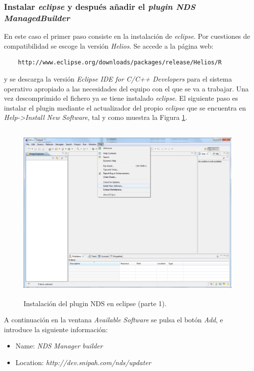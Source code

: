 \subsubsection{Instalar \textit{eclipse} y después añadir el \textit{plugin NDS ManagedBuilder}}
En este caso el primer paso consiste en la instalación de \textit{eclipse}. Por cuestiones de compatibilidad se escoge la versión \textit{Helios}. Se accede a la página web:
\begin{verbatim}
	http://www.eclipse.org/downloads/packages/release/Helios/R
	\end{verbatim}
y se descarga la versión  \textit{Eclipse IDE for C/C++ Developers} para el sistema operativo apropiado a las necesidades del equipo con el que se va a trabajar. Una vez descomprimido el fichero ya se tiene instalado \textit{eclipse}. El siguiente paso es 
instalar el plugin mediante el actualizador del propio \textit{eclipse} que se encuentra en \textit{Help->Install New Software}, tal y como muestra la Figura \ref{fig_c2_win1}.

\begin{figure}[t]
\centering
\includegraphics[height=9cm]{./Figuras/C2/c2_instalar_windows1.png}
\caption{Instalación del plugin NDS en eclipse (parte 1).}
\label{fig_c2_win1}
\end{figure}

A continuación en la ventana \textit{Available Software} se pulsa el botón \textit{Add}, e introduce la siguiente información:
\begin{itemize}
	\item Name: \textit{NDS Manager builder}
	\item Location: \textit{http://dev.snipah.com/nds/updater}
\end{itemize}


